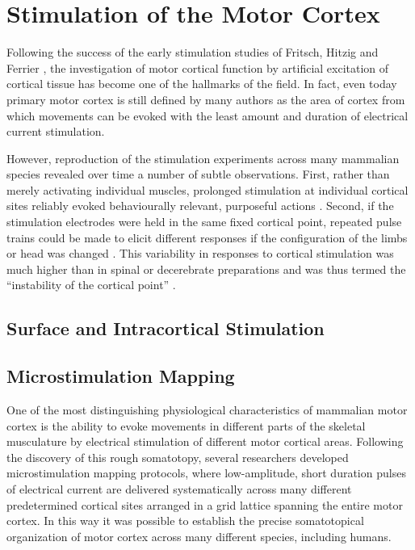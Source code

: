 \section{Stimulation of the Motor Cortex}

Following the success of the early stimulation studies of Fritsch, Hitzig and Ferrier \cite{Fritsch1870,Ferrier1873}, the investigation of motor cortical function by artificial excitation of cortical tissue has become one of the hallmarks of the field. In fact, even today primary motor cortex is still defined by many authors as the area of cortex from which movements can be evoked with the least amount and duration of electrical current stimulation.

However, reproduction of the stimulation experiments across many mammalian species \cite{Ferrier1873,Clark1937} revealed over time a number of subtle observations. First, rather than merely activating individual muscles, prolonged stimulation at individual cortical sites reliably evoked behaviourally relevant, purposeful actions \cite{Ferrier1873,Clark1937}. Second, if the stimulation electrodes were held in the same fixed cortical point, repeated pulse trains could be made to elicit different responses if the configuration of the limbs or head was changed \cite{Ward1938}. This variability in responses to cortical stimulation was much higher than in spinal or decerebrate preparations and was thus termed the ``instability of the cortical point'' \cite{GrahamBrown1912,Leyton1917}.

\subsection{Surface and Intracortical Stimulation}

\subsection{Microstimulation Mapping}

One of the most distinguishing physiological characteristics of mammalian motor cortex is the ability to evoke movements in different parts of the skeletal musculature by electrical stimulation of different motor cortical areas. Following the discovery of this rough somatotopy, several researchers developed microstimulation mapping protocols, where low-amplitude, short duration pulses of electrical current are delivered systematically across many different predetermined cortical sites arranged in a grid lattice spanning the entire motor cortex. In this way it was possible to establish the precise somatotopical organization of motor cortex across many different species, including humans.

